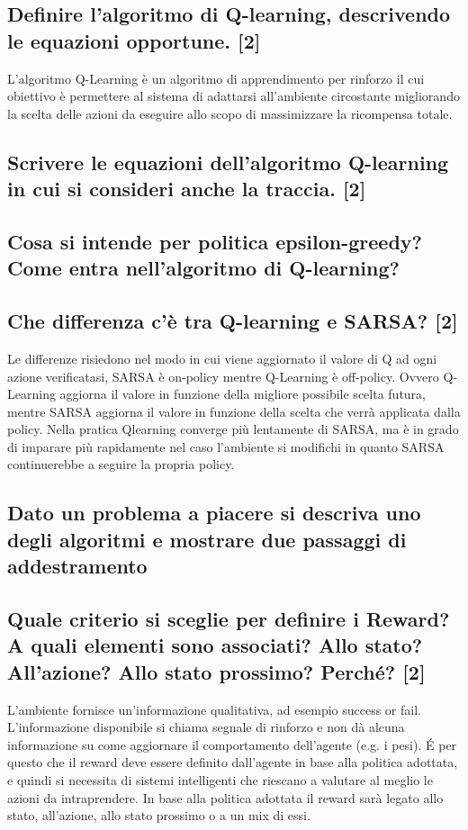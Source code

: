 \documentclass[\main/main.tex]{subfiles}
\begin{document}
\subsection{Definire l’algoritmo di Q-learning, descrivendo le equazioni opportune. [2]}
L'algoritmo Q-Learning è un algoritmo di apprendimento per rinforzo il cui obiettivo è permettere al sistema di adattarsi all'ambiente circostante migliorando la scelta delle azioni da eseguire allo scopo di massimizzare la ricompensa totale.
\subsection{Scrivere le equazioni dell'algoritmo Q-learning in cui si consideri anche la traccia. [2]}
\subsection{Cosa si intende per politica epsilon-greedy? Come entra nell’algoritmo di Q-learning? }
\subsection{Che differenza c'è tra Q-learning e SARSA? [2]}
Le differenze risiedono nel modo in cui viene aggiornato il valore di Q ad ogni azione verificatasi, SARSA è on-policy mentre Q-Learning è off-policy. Ovvero Q­Learning aggiorna il valore in funzione della migliore possibile scelta futura, mentre SARSA aggiorna il valore in funzione della scelta che verrà applicata dalla policy. Nella pratica Q­learning converge più lentamente di SARSA, ma è in grado di imparare più rapidamente nel caso l’ambiente si modifichi in quanto SARSA continuerebbe a seguire la propria policy.

\subsection{Dato un problema a piacere si descriva uno degli algoritmi e mostrare due passaggi di addestramento}
\subsection{Quale criterio si sceglie per definire i Reward? A quali elementi sono associati? Allo stato? All'azione? Allo stato prossimo? Perché? [2]}
L'ambiente fornisce un'informazione qualitativa, ad esempio success or fail.
L'informazione disponibile si chiama segnale di rinforzo e non dà alcuna informazione su come aggiornare il comportamento dell'agente (e.g. i pesi).
É per questo che il reward deve essere definito dall'agente in base alla politica adottata, e quindi si necessita di sistemi intelligenti che riescano a valutare al meglio le azioni da intraprendere.
In base alla politica adottata il reward sarà legato allo stato, all'azione, allo stato prossimo o a un mix di essi.
\end{document}

